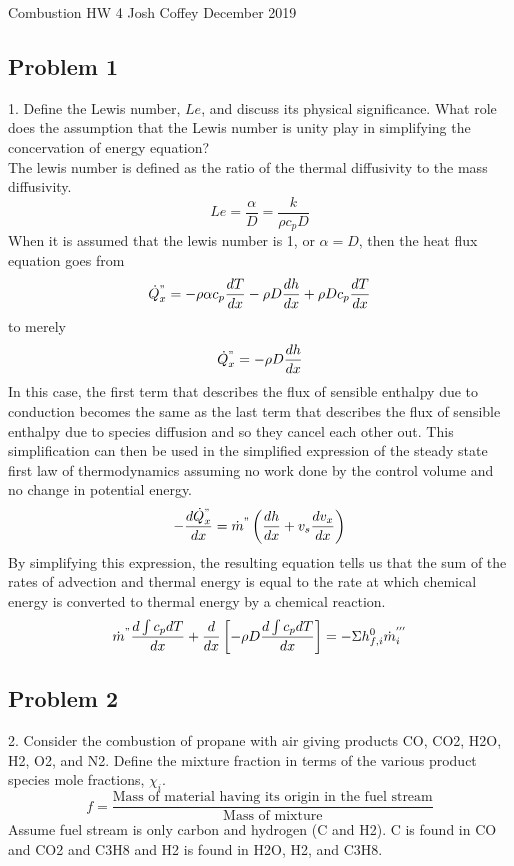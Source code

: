 \documentclass[preview,12pt]{article}
\begin{document}
$$$$
Combustion HW 4 \newline
Josh Coffey \newline
December 2019 \newline

\begin{center}
    \section*{Problem 1}
\end{center}
1. Define the Lewis number, $Le$, and discuss its physical significance.  What role does the assumption that the Lewis number is unity play in simplifying the concervation of energy equation?
$$$$
The lewis number is defined as the ratio of the thermal diffusivity to the mass diffusivity.
$$Le=\frac{\alpha}{D}=\frac{k}{\rho c_p D}$$
When it is assumed that the lewis number is 1, or $\alpha = D$, then the heat flux equation goes from 
$$\dot{Q}^"_x=-\rho\alpha c_p\frac{dT}{dx}-\rho D \frac{dh}{dx}+\rho D c_p\frac{dT}{dx}$$
to merely
$$\dot{Q}^"_x=-\rho D \frac{dh}{dx}$$
In this case, the first term that describes the flux of sensible enthalpy due to conduction becomes the same as the last term that describes the flux of sensible enthalpy due to species diffusion and so they cancel each other out.  This simplification can then be used in the simplified expression of the steady state first law of thermodynamics assuming no work done by the control volume and no change in potential energy. 
$$-\frac{d\dot{Q}^"_x}{dx}=\dot{m}^"\left(\frac{dh}{dx}+v_s\frac{dv_x}{dx}\right)$$
By simplifying this expression, the resulting equation tells us that the sum of the rates of advection and thermal energy is equal to the rate at which chemical energy is converted to thermal energy by a chemical reaction. 
$$\dot{m}^"\frac{d\int c_p dT}{dx}+\frac{d}{dx}\left[-\rho D \frac{d\int c_p dT}{dx}\right]=-\Sigma h^0_{f,i}\dot{m}^{'''}_i$$
\newpage
\begin{center}
    \section*{Problem 2}
\end{center}
2. Consider the combustion of propane with air giving products CO, CO2, H2O, H2, O2, and N2.  Define the mixture fraction in terms of the various product species mole fractions, $\chi_i$.
$$$$
$$f=\frac{\textrm{Mass of material having its origin in the fuel stream}}{\textrm{Mass of mixture}}$$
Assume fuel stream is only carbon and hydrogen (C and H2).  C is found in CO and CO2 and C3H8 and H2 is found in H2O, H2, and C3H8.
\end{document}
